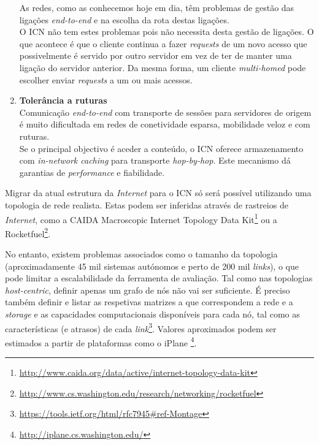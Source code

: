 \documentclass[conference]{IEEEtran}
\begin{document}
\begin{enumerate}
As redes, como as conhecemos hoje em dia, t\^{e}m problemas de gest\~{a}o das liga\c{c}\~{o}es \textit{end-to-end} e na escolha da rota destas liga\c{c}\~{o}es.\\

O ICN n\~{a}o tem estes problemas pois n\~{a}o necessita desta gest\~{a}o de liga\c{c}\~{o}es. O que acontece \'{e} que o cliente continua a fazer \textit{requests} de um novo acesso que possivelmente \'{e} servido por outro servidor em vez de ter de manter uma liga\c{c}\~{a}o do servidor anterior. Da mesma forma, um cliente \textit{multi-homed} pode escolher enviar \textit{requests} a um ou mais acessos.\\

\item \textbf{Toler\^{a}ncia a ruturas}\\

Comunica\c{c}\~{a}o \textit{end-to-end} com transporte de sess\~{o}es para servidores de origem \'{e} muito dificultada em redes de conetividade esparsa, mobilidade veloz e com ruturas.\\

Se o principal objectivo \'{e} aceder a conte\'{u}do, o ICN oferece armazenamento com \textit{in-network caching} para transporte \textit{hop-by-hop}. Este mecanismo d\'{a} garantias de \textit{performance} e fiabilidade.\\

\end{enumerate} 

Migrar da atual estrutura da \textit{Internet} para o ICN s\'{o} ser\'{a} poss\'{i}vel utilizando uma topologia de rede realista. Estas podem ser inferidas atrav\'{e}s de rastreios de \textit{Internet}, como a CAIDA Macroscopic Internet Topology Data Kit\footnote{\url{http://www.caida.org/data/active/internet-topology-data-kit}} ou a Rocketfuel\footnote{\url{http://www.cs.washington.edu/research/networking/rocketfuel}}.
 

No entanto, existem problemas associados como o tamanho da topologia (aproximadamente 45 mil sistemas aut\'{o}nomos e perto de 200 mil \textit{links}), o que pode limitar a escalabilidade da ferramenta de avalia\c{c}\~{a}o. Tal como nas topologias \textit{host-centric}, definir apenas um grafo de n\'{o}s n\~{a}o vai ser suficiente. É preciso tamb\'{e}m definir e listar as respetivas matrizes a que correspondem a rede e a \textit{storage} e as capacidades computacionais dispon\'{i}veis para cada n\'{o}, tal como as caracter\'{i}sticas (e atrasos) de cada \textit{link}\footnote{\url{https://tools.ietf.org/html/rfc7945#ref-Montage}}. Valores aproximados podem ser estimados a partir de plataformas como o iPlane \footnote{\url{http://iplane.cs.washington.edu/}}.
\\
\end{document}
